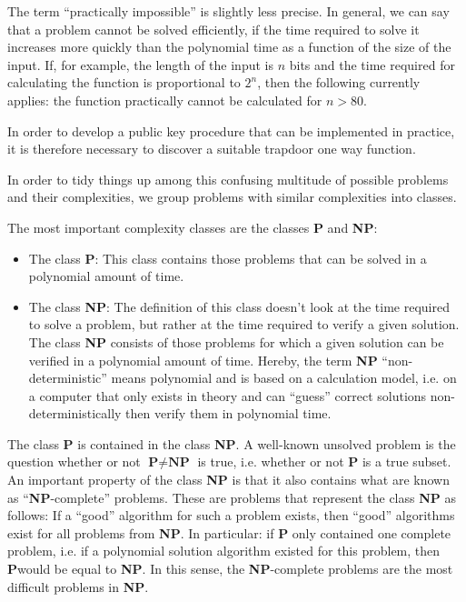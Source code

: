 The term ``practically impossible'' is slightly less precise. In 
general, we can say that a problem cannot be solved  
efficiently, if the time required to solve it increases more quickly than the 
polynomial time as a function of the size of the input. If, for example, the 
length of the input is $ n $  bits and the time required for calculating the 
function is proportional to $ 2^n $, then the following currently applies: the 
function practically cannot be calculated for $n > 80$.

In order to develop a public key procedure that can be implemented in practice, 
it is therefore necessary to discover a suitable trapdoor one way function.\par

In order to tidy things up among this confusing multitude of possible problems 
and their complexities, we group problems with similar complexities into 
classes.

The most important complexity classes are the classes \textbf{P} and 
\textbf{NP}: 

\begin{itemize}

    \item The class \textbf{P}: This class contains those problems that can be 
solved in a polynomial  amount of time.
    
		\item The class \textbf{NP}: The definition of this class doesn't look at
		the time required to solve a problem, but rather at the time required to
		verify a given solution. The class \textbf{NP} consists of those problems
		for which a given solution can be verified in a polynomial  amount of time.
		Hereby, the term \textbf{NP} ``non-deterministic'' means polynomial and is
		based on a calculation model, i.e. on a computer that only exists in theory
		and can ``guess'' correct solutions non-deterministically then verify them
		in polynomial time.

\end{itemize}

The class \textbf{P} is contained in the class \textbf{NP}. A well-known 
unsolved problem is the question whether or not $ \textbf{P} \neq \textbf{NP} $ 
is true, i.e. whether or not \textbf{P} is a true subset. An important property 
of the class \textbf{NP} is that it also contains what are known as ``\textbf{NP}-complete''
problems. These are problems that represent the 
class \textbf{NP} as follows: If a ``good'' algorithm for such a 
problem exists, then ``good'' algorithms exist for all problems from 
\textbf{NP}. In particular: if \textbf{P} only contained one complete problem, 
i.e. if a polynomial  solution algorithm existed for this problem, then 
\textbf{P}would be equal to \textbf{NP}. In this sense, the \textbf{NP}-complete 
problems are the most difficult problems in \textbf{NP}.

